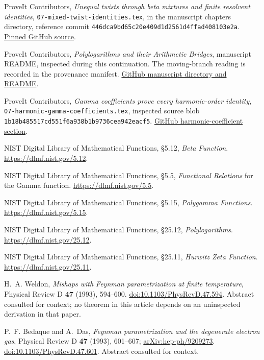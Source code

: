 ProveIt Contributors,
\emph{Unequal twists through beta mixtures and finite resolvent identities},
\texttt{07-mixed-twist-identities.tex}, in the manuscript chapters directory,
reference commit \texttt{446dca9bd65c20e409d1d2561d4ffad408103e2a}.
\href{https://github.com/VladimirReshetnikov/ProveIt/blob/446dca9bd65c20e409d1d2561d4ffad408103e2a/Analysis/Polylogarithms/docs/manuscript/chapters/07-mixed-twist-identities.tex}{Pinned GitHub source}.

ProveIt Contributors,
\emph{Polylogarithms and their Arithmetic Bridges}, manuscript README,
inspected during this continuation. The moving-branch reading is
recorded in the provenance manifest.
\href{https://github.com/VladimirReshetnikov/ProveIt/tree/main/Analysis/Polylogarithms/docs/manuscript}{GitHub manuscript directory and README}.

ProveIt Contributors,
\emph{Gamma coefficients prove every harmonic-order identity},
\texttt{07-harmonic-gamma-coefficients.tex}, inspected source blob
\texttt{1b18b485517cd551f6a938b1b9736cea942eacf5}.
\href{https://github.com/VladimirReshetnikov/ProveIt/blob/main/Analysis/Polylogarithms/docs/manuscript/chapters/07-harmonic-gamma-coefficients.tex}{GitHub harmonic-coefficient section}.

NIST Digital Library of Mathematical Functions,
\S5.12, \emph{Beta Function}.
\url{https://dlmf.nist.gov/5.12}.

NIST Digital Library of Mathematical Functions,
\S5.5, \emph{Functional Relations} for the Gamma function.
\url{https://dlmf.nist.gov/5.5}.

NIST Digital Library of Mathematical Functions,
\S5.15, \emph{Polygamma Functions}.
\url{https://dlmf.nist.gov/5.15}.

NIST Digital Library of Mathematical Functions,
\S25.12, \emph{Polylogarithms}.
\url{https://dlmf.nist.gov/25.12}.

NIST Digital Library of Mathematical Functions,
\S25.11, \emph{Hurwitz Zeta Function}.
\url{https://dlmf.nist.gov/25.11}.

H.~A. Weldon,
\emph{Mishaps with Feynman parametrization at finite temperature},
Physical Review D \textbf{47} (1993), 594--600.
\href{https://doi.org/10.1103/PhysRevD.47.594}{doi:10.1103/PhysRevD.47.594}.
Abstract consulted for context; no theorem in this article depends on
an uninspected derivation in that paper.

P.~F. Bedaque and A.~Das,
\emph{Feynman parametrization and the degenerate electron gas},
Physical Review D \textbf{47} (1993), 601--607;
\href{https://arxiv.org/abs/hep-ph/9209273}{arXiv:hep-ph/9209273}.
\href{https://doi.org/10.1103/PhysRevD.47.601}{doi:10.1103/PhysRevD.47.601}.
Abstract consulted for context.
